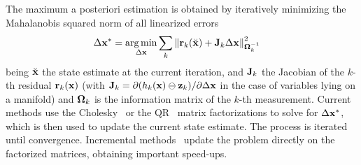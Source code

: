 The maximum a posteriori estimation is obtained by iteratively minimizing the Mahalanobis squared norm of all linearized errors
%
\begin{align}
  \Delta {\bf x}^* &= \operatorname*{arg\,min}_{\Delta {\bf x}} \sum_k {\left\| {\bf r}_k(\breve{{\bf x}}) + {\bf J}_k \Delta {\bf x} \right\|}_{{\bm \Omega}_k^{-1}}^2 \label{eq:LeastSquares}
\end{align}
%
being $\breve{{\bf x}}$ the state estimate at the current iteration, and ${\bf J}_k$ the Jacobian of the $k$-th residual ${\bf r}_k({\bf x})$ (with \mbox{${\bf J}_k = \partial (h_k({\bf x})\ominus{\bf z}_k)/\partial \Delta {\bf x}$} in the case of variables lying on a manifold) and ${\bm \Omega}_k$ is the information matrix of the $k$-th measurement.
%
Current methods use the Cholesky~\cite{Kummerle_icra11,ila_ijrr17} or the QR~\cite{Dellaert_ijrr06,Kaess_ijrr11} matrix factorizations to solve for $\Delta{\bf x}^*$, which is then used to update the current state estimate. 
The process is iterated until convergence.
%
Incremental methods~\cite{ila_ijrr17,Kaess_ijrr11} update the problem directly on the factorized matrices, obtaining important speed-ups.






